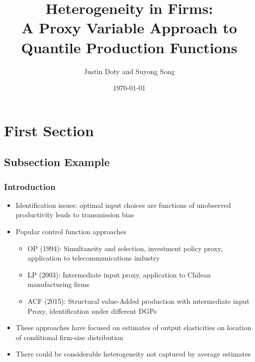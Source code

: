 \documentclass{beamer}
\title[Quantile Production Functions]{Heterogeneity in Firms:\\
A Proxy Variable Approach to Quantile Production Functions}
\author{Justin Doty and Suyong Song} %
\institute[] %
{
\\  
\medskip %
}
\date{\today} %
\begin{document}
\begin{frame}
\titlepage %
\end{frame}


\section{First Section} %

\subsection{Subsection Example} %

\begin{frame}
\frametitle{Introduction}
\begin{itemize}
\item Identification issues: optimal input choices are functions of unobserved productivity leads to transmission bias

\item Popular control function approaches
\begin{itemize}
	\item OP (1994): Simultaneity and selection, investment policy proxy, application to telecommunications industry
	\item LP (2003): Intermediate input proxy, application to Chilean manufacturing firms
	\item ACF (2015): Structural value-Added production with intermediate input Proxy, identification under different DGPs
\end{itemize}

\item These approaches have focused on estimates of output elasticities on location of conditional firm-size distribution
\item There could be considerable heterogeneity not captured by average estimates

\end{itemize}
\end{frame}
\end{document}
